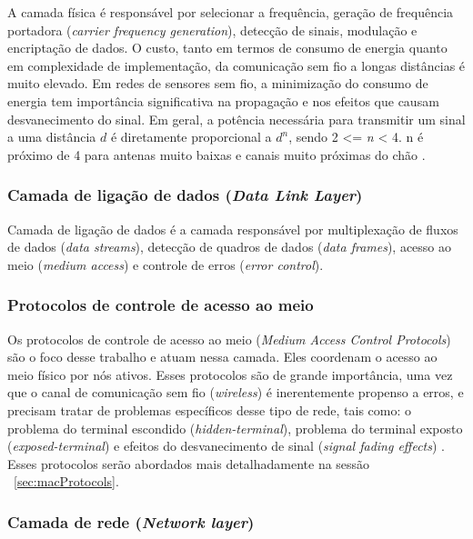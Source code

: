  A camada física é responsável por selecionar a frequência, geração de frequência portadora (\textit{carrier frequency generation}), detecção de sinais, modulação e encriptação de dados. O custo, tanto em termos de consumo de energia quanto em complexidade de implementação, da comunicação sem fio a longas distâncias é muito elevado. Em redes de sensores sem fio, a minimização do consumo de energia tem importância significativa na propagação e nos efeitos que causam desvanecimento do sinal. Em geral, a potência necessária para transmitir um sinal a uma distância \textit{$d$} é diretamente proporcional a \textit{$d^{n}$}, sendo 2 <= \textit{n} < 4. n é próximo de 4 para antenas muito baixas e canais muito próximas do chão \cite{Pottie2000}.
 
 \subsubsection{Camada de ligação de dados (\textit{Data Link Layer}) }
 
 Camada de ligação de dados é a camada responsável por multiplexação de fluxos de dados (\textit{data streams}), detecção de quadros de dados (\textit{data frames}), acesso ao meio (\textit{medium access}) e controle de erros (\textit{error control}).
 
 \subsubsection*{Protocolos de controle de acesso ao meio}
 
Os protocolos de controle de acesso ao meio (\textit{Medium Access Control Protocols}) são o foco desse trabalho e atuam nessa camada. Eles coordenam o acesso ao meio físico por nós ativos. Esses protocolos são de grande importância, uma vez que o canal de comunicação sem fio (\textit{wireless}) é inerentemente propenso a erros, e precisam tratar de problemas específicos desse tipo de rede, tais como: o problema do terminal escondido (\textit{hidden-terminal}), problema do terminal exposto (\textit{exposed-terminal}) e efeitos do desvanecimento de sinal (\textit{signal fading effects}) \cite{Kumar06mediumaccess}. Esses protocolos serão abordados mais detalhadamente na sessão ~\ref{sec:macProtocols}.

 
 \subsubsection{Camada de rede (\textit{Network layer})} 
 
